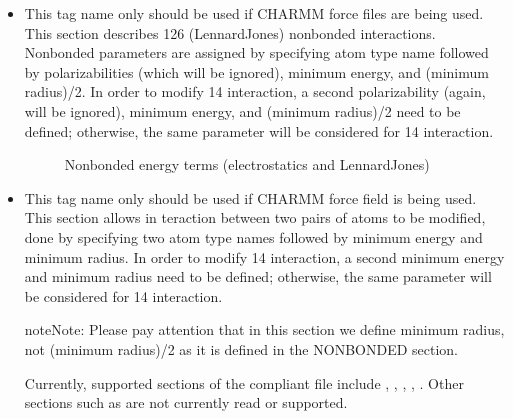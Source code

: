 \documentclass[letterpaper,10pt,english]{sphinxmanual}
\begin{document}
\begin{itemize}
\item {} 
\sphinxhyphen{} This tag name only should be used if CHARMM force files are being used. This section describes 12\sphinxhyphen{}6 (Lennard\sphinxhyphen{}Jones) non\sphinxhyphen{}bonded interactions. Non\sphinxhyphen{}bonded parameters are assigned by specifying atom type name followed by polarizabilities (which will be ignored), minimum energy, and (minimum radius)/2. In order to modify 1\sphinxhyphen{}4 interaction, a second polarizability (again, will be ignored), minimum energy, and (minimum radius)/2 need to be defined; otherwise, the same parameter will be considered for 1\sphinxhyphen{}4 interaction.

\begin{figure}[htbp]
\centering
\capstart

\noindent{}
\caption{Non\sphinxhyphen{}bonded energy terms (electrostatics and Lennard\sphinxhyphen{}Jones)}\label{\detokenize{input_file:id4}}\end{figure}

\item {} 
\sphinxhyphen{} This tag name only should be used if CHARMM force field is being used. This section allows in\sphinxhyphen{} teraction between two pairs of atoms to be modified, done by specifying two atom type names followed by minimum energy and minimum radius. In order to modify 1\sphinxhyphen{}4 interaction, a second minimum energy and minimum radius need to be defined; otherwise, the same parameter will be considered for 1\sphinxhyphen{}4 interaction.

\begin{sphinxadmonition}{note}{Note:}
Please pay attention that in this section we define minimum radius, not (minimum radius)/2 as it is defined in the NONBONDED section.
\end{sphinxadmonition}

Currently, supported sections of the  compliant file include , , , , . Other sections such as  are not currently read or supported.

\end{itemize}
\end{document}
